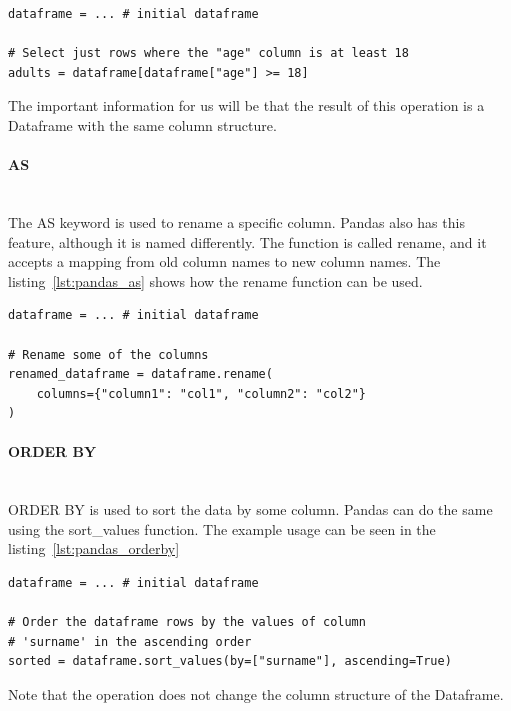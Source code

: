 \begin{lstlisting}[caption=Where in Pandas, label={lst:pandas_where}, captionpos=b]
dataframe = ... # initial dataframe

# Select just rows where the "age" column is at least 18
adults = dataframe[dataframe["age"] >= 18]
\end{lstlisting}

The important information for us will be that the result of this operation is a Dataframe with the same column structure.

\paragraph{AS} \leavevmode \\

The AS keyword is used to rename a specific column.
Pandas also has this feature, although it is named differently.
The function is called rename, and it accepts a mapping from old column names to new column names.
The listing~\ref{lst:pandas_as} shows how the rename function can be used.

\begin{lstlisting}[caption=As in Pandas, label={lst:pandas_as}, captionpos=b]
dataframe = ... # initial dataframe

# Rename some of the columns
renamed_dataframe = dataframe.rename(
    columns={"column1": "col1", "column2": "col2"}
)
\end{lstlisting}

\paragraph{ORDER BY} \leavevmode \\

ORDER BY is used to sort the data by some column.
Pandas can do the same using the sort\_values function.
The example usage can be seen in the listing~\ref{lst:pandas_orderby}

\begin{lstlisting}[caption=Order by in Pandas, label={lst:pandas_orderby}, captionpos=b]
dataframe = ... # initial dataframe

# Order the dataframe rows by the values of column
# 'surname' in the ascending order
sorted = dataframe.sort_values(by=["surname"], ascending=True)
\end{lstlisting}

Note that the operation does not change the column structure of the Dataframe.

